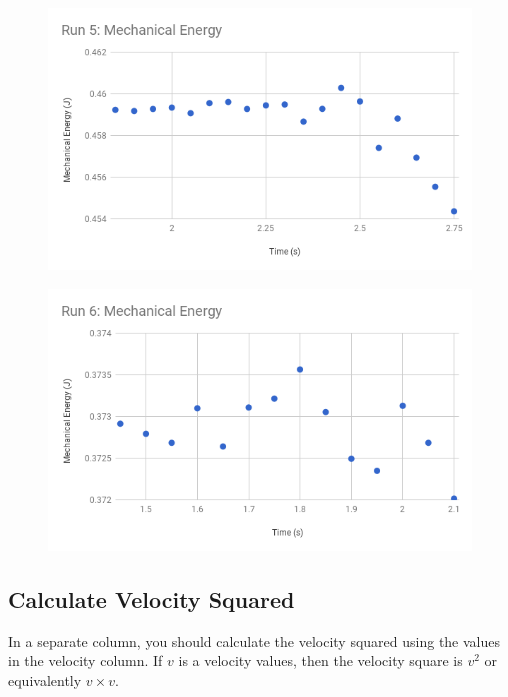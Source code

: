 \begin{figure}
    \centering
    \includegraphics[scale=0.71]{image/07-mechanic/run-5-energy.png}
    \caption{}
    \label{figure.07.run.5.e}
\end{figure}
\begin{figure}
    \centering
    \includegraphics[scale=0.71]{image/07-mechanic/run-6-energy.png}
    \caption{}
    \label{figure.07.run.6.e}
\end{figure}
\subsection{Calculate Velocity Squared}
In a separate column, you should calculate the velocity squared using the values in the velocity column. If $v$ is a velocity values, then the velocity square is $v^2$ or equivalently $v \times v$.
